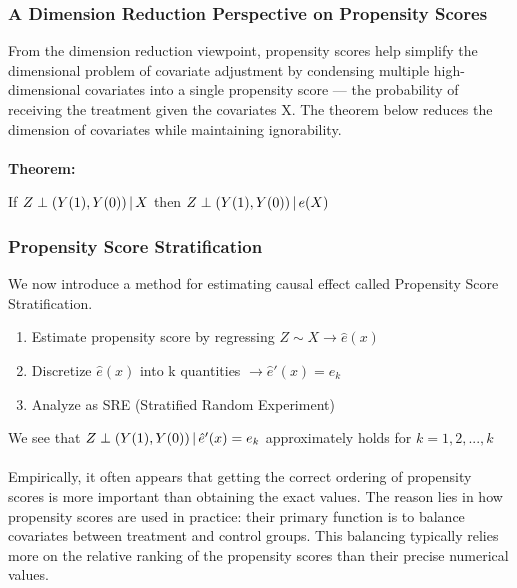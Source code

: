 \subsubsection{A Dimension Reduction Perspective on Propensity Scores}
From the dimension reduction viewpoint, propensity scores help simplify the dimensional problem of covariate adjustment by condensing multiple high-dimensional covariates into a single propensity score — the probability of receiving the treatment given the covariates X. The theorem below reduces the dimension of covariates while maintaining ignorability.
\\\\
\textbf{Theorem:}
\begin{center}
    If $Z \perp (Y(1), Y(0)) \thinspace|\thinspace X$
then $Z \perp (Y(1), Y(0)) \thinspace|\thinspace e(X)$
\end{center}

\subsubsection{Propensity Score Stratification}
We now introduce a method for estimating causal effect called Propensity Score Stratification.
\begin{enumerate}
    \item Estimate propensity score by regressing $Z \sim X \rightarrow \hat{e}(x)$
    \item Discretize $\hat{e}(x)$ into k quantities $\rightarrow \hat{e}'(x) = e_k$
    \item Analyze as SRE (Stratified Random Experiment)
\end{enumerate}

We see that $Z \perp (Y(1), Y(0)) \thinspace|\thinspace \hat{e}'(x) = e_k$ approximately holds for $k = 1,2,...,k$\\\\
Empirically, it often appears that getting the correct ordering of propensity scores is more important than obtaining the exact values. The reason lies in how propensity scores are used in practice: their primary function is to balance covariates between treatment and control groups. This balancing typically relies more on the relative ranking of the propensity scores than their precise numerical values.



